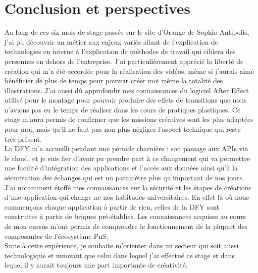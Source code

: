 \chapter*{Conclusion et perspectives}
\label{sec:conclusion}

Au long de ces six mois de stage passés sur le site d'Orange de Sophia-Antipolis, j'ai pu découvrir un métier aux enjeux variés allant de l'explication de technologies en interne à 
l'explication de méthodes de travail qui ciblera des personnes en dehors de l'entreprise. 
J'ai particulièrement apprécié la liberté de création qui m'a été accordée pour la réalisation des vidéos, même si j'aurais aimé bénéficier de plus de temps pour pouvoir créer moi même la totalité des illustrations. J'ai aussi dû approfondir mes connaissances du logiciel After Effect utilisé pour le montage pour pouvoir produire des effets de transitions que nous n'avions pas eu le temps de réaliser dans les cours de pratiques plastiques. Ce stage m'aura permis de confirmer que les missions créatives sont les plus adaptées pour moi, mais qu'il ne faut pas non plus négliger l'aspect technique qui reste très présent.\\

La DFY m’a accueilli pendant une période charnière : son passage aux APIs via le cloud, et je suis fier d’avoir pu prendre part à ce changement qui va permettre une facilité d'intégration des applications et l'accès aux données ainsi qu'à la sécurisation des échanges qui est un paramètre plus qu'important de nos jours. J'ai notamment étoffé mes connaissances sur la sécurité et les étapes de créations d'une application qui change ne nos habitudes universitaires. En effet là où nous commençons chaque application à partir de rien, celles de la DFY sont construites à partir de briques pré-établies. Les connaissances acquises au cours de mon cursus m'ont permis de comprendre le fonctionnement de la plupart des composantes de l'écosystème PnS.\\

Suite à cette expérience, je souhaite m'orienter dans un secteur qui soit aussi technologique et innovant que celui dans lequel j'ai effectué ce stage et dans lequel il y aurait toujours une part importante de créativité.



